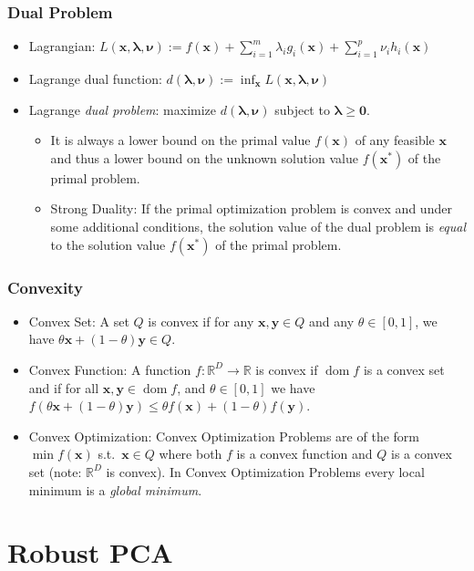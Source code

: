 \documentclass[conference,11pt]{IEEEtran}
\newcommand{\vect}[1]{\boldsymbol{\mathbf{#1}}}
\DeclareMathOperator{\dom}{dom}
\newcommand{\from}{\colon}
\newcommand{\R}{\mathbb{R}}
\begin{document}
\subsubsection{Dual Problem}
\begin{itemize}
  \item Lagrangian: $L(\vect{x},\vect{\lambda},\vect{\nu}) := f(\vect{x}) +
    \sum_{i=1}^m \lambda_i g_i(\vect{x}) + \sum_{i=1}^p \nu_i h_i(\vect{x})$
  \item Lagrange dual function: $d(\vect{\lambda},\vect{\nu}) := \inf_{\vect{x}}
    L(\vect{x},\vect{\lambda},\vect{\nu})$
  \item Lagrange \emph{dual problem}: maximize $d(\vect{\lambda},\vect{\nu})$
    subject to $\vect{\lambda} \geq \vect{0}$.
    \begin{itemize}
      \item It is always a lower bound on the primal value $f(\vect{x})$ of any
        feasible $\vect{x}$ and thus a lower bound on the unknown solution value
        $f(\vect{x}^*)$ of the primal problem.
      \item Strong Duality: If the primal optimization problem is convex and
        under some additional conditions, the solution value of the dual
        problem is \emph{equal} to the solution value $f(\vect{x}^*)$ of the
        primal problem.
    \end{itemize}
\end{itemize}

\subsubsection{Convexity}
\begin{itemize}
  \item Convex Set: A set $Q$ is convex if for any $\vect{x},\vect{y} \in Q$
    and any $\theta \in [0,1]$, we have $\theta\vect{x} + (1-\theta) \vect{y}
    \in Q$.
  \item Convex Function: A function $f\from\R^D\to\R$ is convex if $\dom f$ is
    a convex set and if for all $\vect{x},\vect{y}\in\dom f$, and $\theta\in
    [0,1]$ we have $f(\theta\vect{x} + (1-\theta)\vect{y}) \leq \theta
    f(\vect{x}) + (1-\theta)f(\vect{y})$.
  \item Convex Optimization: Convex Optimization Problems are of the form $\min
    f(\vect{x})$ s.t.\ $\vect{x}\in Q$ where both $f$ is a convex function and
    $Q$ is a convex set (note: $\R^D$ is convex). In Convex Optimization
    Problems every local minimum is a \emph{global minimum}.

\end{itemize}

\section{Robust PCA}
\end{document}
